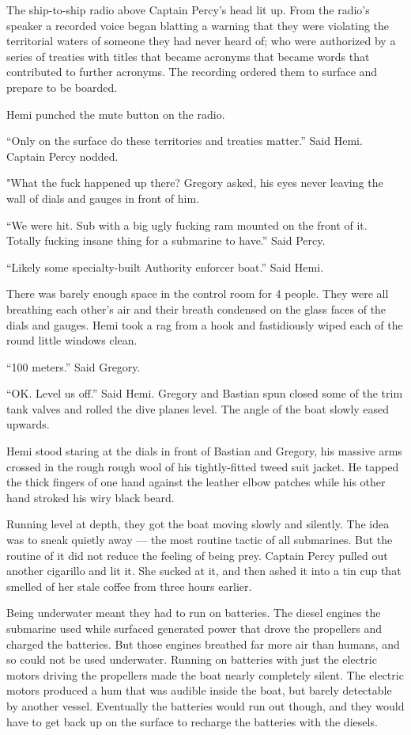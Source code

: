 \documentclass[]{article}
\begin{document}
\begin{multicols}{2}
The ship-to-ship radio above Captain Percy's head lit up. From the
radio's speaker a recorded voice began blatting a warning that they were
violating the territorial waters of someone they had never heard of; who
were authorized by a series of treaties with titles that became acronyms
that became words that contributed to further acronyms. The recording
ordered them to surface and prepare to be boarded.

Hemi punched the mute button on the radio.

``Only on the surface do these territories and treaties matter.'' Said
Hemi. Captain Percy nodded.

"What the fuck happened up there? Gregory asked, his eyes never leaving
the wall of dials and gauges in front of him.

``We were hit. Sub with a big ugly fucking ram mounted on the front of
it. Totally fucking insane thing for a submarine to have.'' Said Percy.

``Likely some specialty-built Authority enforcer boat.'' Said Hemi.

There was barely enough space in the control room for 4 people. They
were all breathing each other's air and their breath condensed on the
glass faces of the dials and gauges. Hemi took a rag from a hook and
fastidiously wiped each of the round little windows clean.

``100 meters.'' Said Gregory.

``OK. Level us off.'' Said Hemi. Gregory and Bastian spun closed some of
the trim tank valves and rolled the dive planes level. The angle of the
boat slowly eased upwards.

Hemi stood staring at the dials in front of Bastian and Gregory, his
massive arms crossed in the rough rough wool of his tightly-fitted tweed
suit jacket. He tapped the thick fingers of one hand against the leather
elbow patches while his other hand stroked his wiry black beard.

Running level at depth, they got the boat moving slowly and silently.
The idea was to sneak quietly away --- the most routine tactic of all
submarines. But the routine of it did not reduce the feeling of being
prey. Captain Percy pulled out another cigarillo and lit it. She sucked
at it, and then ashed it into a tin cup that smelled of her stale coffee
from three hours earlier.

Being underwater meant they had to run on batteries. The diesel engines
the submarine used while surfaced generated power that drove the
propellers and charged the batteries. But those engines breathed far
more air than humans, and so could not be used underwater. Running on
batteries with just the electric motors driving the propellers made the
boat nearly completely silent. The electric motors produced a hum that
was audible inside the boat, but barely detectable by another vessel.
Eventually the batteries would run out though, and they would have to
get back up on the surface to recharge the batteries with the diesels.


\end{multicols}
\end{document}
